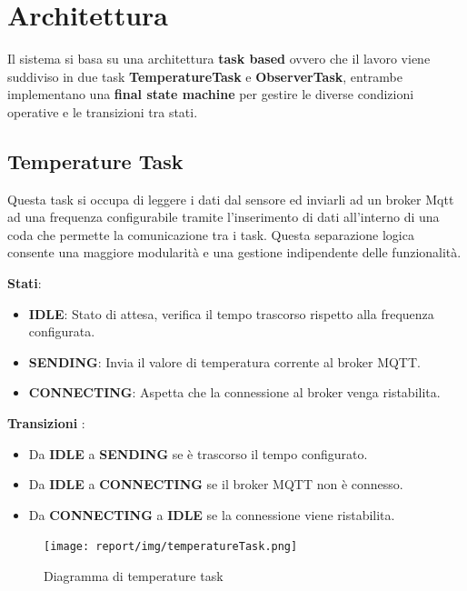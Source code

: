 \documentclass{report}
\begin{document}
\section{Architettura}

\par{
    Il sistema si basa su una architettura \textbf{task based} ovvero che il lavoro viene suddiviso in due task \textbf{TemperatureTask} e \textbf{ObserverTask}, entrambe implementano una \textbf{final state machine} per gestire le diverse condizioni operative e le transizioni tra stati. 
}
\subsection{Temperature Task}

\par{
    Questa task si occupa di leggere i dati dal sensore ed inviarli ad un broker Mqtt ad una frequenza configurabile tramite l'inserimento di dati all'interno di una coda che permette la comunicazione tra i task. Questa separazione logica consente una maggiore modularità e una gestione indipendente delle funzionalità.\newline
}
\par{\textbf{Stati}:}
\begin{itemize}
    \item \textbf{IDLE}: Stato di attesa, verifica il tempo trascorso rispetto alla frequenza configurata.
    \item \textbf{SENDING}: Invia il valore di temperatura corrente al broker MQTT.
    \item \textbf{CONNECTING}: Aspetta che la connessione al broker venga ristabilita.
\end{itemize}
\par{
    \textbf{Transizioni} :
}
\begin{itemize}
    \item Da \textbf{IDLE} a \textbf{SENDING} se è trascorso il tempo configurato.
    \item Da \textbf{IDLE} a \textbf{CONNECTING} se il broker MQTT non è connesso.
    \item Da \textbf{CONNECTING} a \textbf{IDLE} se la connessione viene ristabilita.
\end{itemize}


\begin{figure}[!h]
    \centering
    \texttt{[image: report/img/temperatureTask.png]}
    \caption{Diagramma di temperature task}
    \label{fig:stati}
\end{figure}
\end{document}
